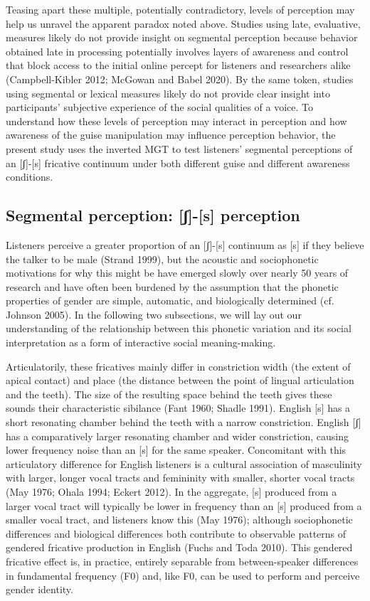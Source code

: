 \documentclass[
  letterpaper,
  DIV=11,
  numbers=noendperiod]{scrartcl}
\begin{document}
Teasing apart these multiple, potentially contradictory, levels of
perception may help us unravel the apparent paradox noted above. Studies
using late, evaluative, measures likely do not provide insight on
segmental perception because behavior obtained late in processing
potentially involves layers of awareness and control that block access
to the initial online percept for listeners and researchers alike
(Campbell-Kibler 2012; McGowan and Babel 2020). By the same token,
studies using segmental or lexical measures likely do not provide clear
insight into participants' subjective experience of the social qualities
of a voice. To understand how these levels of perception may interact in
perception and how awareness of the guise manipulation may influence
perception behavior, the present study uses the inverted MGT to test
listeners' segmental perceptions of an {[}ʃ{]}-{[}s{]} fricative
continuum under both different guise and different awareness conditions.

\subsection{Segmental perception: {[}ʃ{]}-{[}s{]}
perception}\label{sec-fricative-gender}

Listeners perceive a greater proportion of an {[}ʃ{]}-{[}s{]} continuum
as {[}s{]} if they believe the talker to be male (Strand 1999), but the
acoustic and sociophonetic motivations for why this might be have
emerged slowly over nearly 50 years of research and have often been
burdened by the assumption that the phonetic properties of gender are
simple, automatic, and biologically determined (cf. Johnson 2005). In
the following two subsections, we will lay out our understanding of the
relationship between this phonetic variation and its social
interpretation as a form of interactive social meaning-making.

Articulatorily, these fricatives mainly differ in constriction width
(the extent of apical contact) and place (the distance between the point
of lingual articulation and the teeth). The size of the resulting space
behind the teeth gives these sounds their characteristic sibilance (Fant
1960; Shadle 1991). English {[}s{]} has a short resonating chamber
behind the teeth with a narrow constriction. English {[}ʃ{]} has a
comparatively larger resonating chamber and wider constriction, causing
lower frequency noise than an {[}s{]} for the same speaker. Concomitant
with this articulatory difference for English listeners is a cultural
association of masculinity with larger, longer vocal tracts and
femininity with smaller, shorter vocal tracts (May 1976; Ohala 1994;
Eckert 2012). In the aggregate, {[}s{]} produced from a larger vocal
tract will typically be lower in frequency than an {[}s{]} produced from
a smaller vocal tract, and listeners know this (May 1976); although
sociophonetic differences and biological differences both contribute to
observable patterns of gendered fricative production in English (Fuchs
and Toda 2010). This gendered fricative effect is, in practice, entirely
separable from between-speaker differences in fundamental frequency (F0)
and, like F0, can be used to perform and perceive gender identity.
\end{document}
